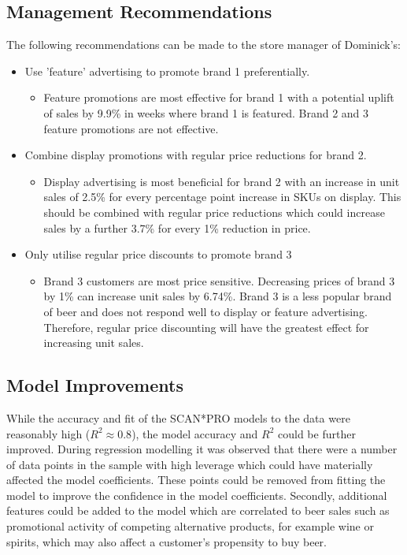 \documentclass[a4paper,11pt]{article}
\begin{document}
\subsection{Management Recommendations}
The following recommendations can be made to the store manager of Dominick's:
\begin{itemize}
    \item Use 'feature' advertising to promote brand 1 preferentially.
    \begin{itemize}
        \item Feature promotions are most effective for brand 1 with a potential uplift of sales by 9.9\% in weeks where brand 1 is featured. Brand 2 and 3 feature promotions are not effective.
    \end{itemize}
    \item Combine display promotions with regular price reductions for brand 2.
    \begin{itemize}
        \item Display advertising is most beneficial for brand 2 with an increase in unit sales of 2.5\% for every percentage point increase in SKUs on display. This should be combined with regular price reductions which could increase sales by a further 3.7\% for every 1\% reduction in price.
    \end{itemize}
    \item Only utilise regular price discounts to promote brand 3
    \begin{itemize}
        \item Brand 3 customers are most price sensitive. Decreasing prices of brand 3 by 1\% can increase unit sales by 6.74\%. Brand 3 is a less popular brand of beer and does not respond well to display or feature advertising. Therefore, regular price discounting will have the greatest effect for increasing unit sales. 
    \end{itemize}
    

\end{itemize}

\subsection{Model Improvements}
While the accuracy and fit of the SCAN*PRO models to the data were reasonably high ($R^2 \approx 0.8$), the model accuracy and $R^2$ could be further improved. During regression modelling it was observed that there were a number of data points in the sample with high leverage which could have materially affected the model coefficients. These points could be removed from fitting the model to improve the confidence in the model coefficients. Secondly, additional features could be added to the model which are correlated to beer sales such as promotional activity of competing alternative products, for example wine or spirits, which may also affect a customer's propensity to buy beer.
\end{document}
